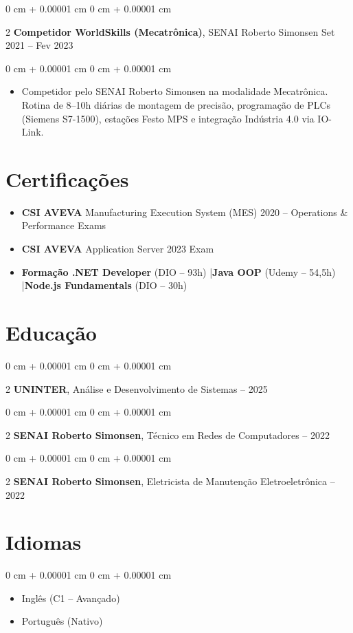 \documentclass[10pt, letterpaper]{article}
\newenvironment{highlights}{ \begin{itemize}[ topsep=0.10 cm, parsep=0.10 cm, partopsep=0pt,
itemsep=0pt, leftmargin=0 cm + 10pt ] }{ \end{itemize} } %
\newenvironment{onecolentry}{ \begin{adjustwidth}{ 0 cm + 0.00001 cm }{ 0 cm + 0.00001 cm }
}{ \end{adjustwidth} } %
\newenvironment{twocolentry}[2][]{ \onecolentry \def\secondColumn{#2} \setcolumnwidth{\fill, 4.5 cm}
\begin{paracol}{2} }{ \switchcolumn \raggedleft \secondColumn \end{paracol}
\endonecolentry } %
\begin{document}
    \vspace{0.2 cm}

    \begin{twocolentry}
		{ Set 2021 -- Fev 2023 } \textbf{Competidor WorldSkills (Mecatr\^onica)}, SENAI Roberto Simonsen
	\end{twocolentry}

	\vspace{0.10 cm}
	\begin{onecolentry}
		\begin{highlights}
			\item Competidor pelo SENAI Roberto Simonsen na modalidade Mecatr\^onica. Rotina de 8--10h di\'arias de montagem de precis\~ao, programa\c{c}\~ao de PLCs (Siemens S7-1500), esta\c{c}\~oes Festo MPS e integra\c{c}\~ao Ind\'ustria 4.0 via IO-Link.
		\end{highlights}
	\end{onecolentry}

    \section{Certifica\c{c}\~oes}

    \begin{highlights}
        \item \textbf{CSI AVEVA} Manufacturing Execution System (MES) 2020 -- Operations \& Performance Exams
        \item \textbf{CSI AVEVA} Application Server 2023 Exam
        \item \textbf{Forma\c{c}\~ao .NET Developer} (DIO -- 93h) \quad|\quad \textbf{Java OOP} (Udemy -- 54,5h) \quad|\quad \textbf{Node.js Fundamentals} (DIO -- 30h)
    \end{highlights}

	\section{Educa\c{c}\~ao}

	\begin{twocolentry}
		{2023 -- 2025} \textbf{UNINTER}, An\'alise e Desenvolvimento de Sistemas
	\end{twocolentry}

	\begin{twocolentry}
		{2021 -- 2022} \textbf{SENAI Roberto Simonsen}, T\'ecnico em Redes de Computadores
	\end{twocolentry}

    \begin{twocolentry}
		{2020 -- 2022} \textbf{SENAI Roberto Simonsen}, Eletricista de Manuten\c{c}\~ao Eletroeletr\^onica
	\end{twocolentry}

	\section{Idiomas}

	\begin{onecolentry}
		\begin{highlights}
			\item Ingl\^es (C1 -- Avan\c{c}ado)
			\item Portugu\^es (Nativo)
		\end{highlights}
	\end{onecolentry}
\end{document}
